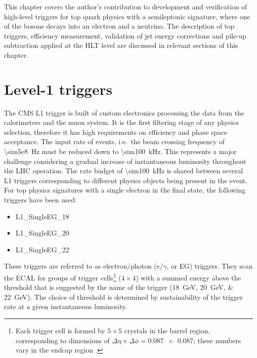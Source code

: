 This chapter covers the author's contribution to development and verification of high-level triggers for top quark
physics with a semileptonic signature, where one of the \W bosons decays into an electron and a neutrino. The description
of top triggers, efficiency measurement, validation of jet energy corrections and pile-up subtraction applied at the HLT
level are discussed in relevant sections of this chapter.

\section{Level-1 triggers}
The CMS L1 trigger \autocite{CMS_L1_Trigger_TDR} is built of custom electronics processing the data from the
calorimeters and the muon system. It is the first filtering stage of any physics selection, therefore it has high
requirements on efficiency and phase space acceptance. The input rate of events, i.e.\ the beam crossing frequency of
\SI{\sim5e8}{\hertz} must be reduced down to \SI{\sim100}{\kilo\hertz}. This represents a major challenge considering a
gradual increase of instantaneous luminosity throughout the LHC operation. The rate budget of \SI{\sim100}{\kilo\hertz}
is shared between several L1 triggers corresponding to different physics objects being present in the event. For top
physics signatures with a single electron in the final state, the following triggers have been used:

\begin{itemize}
 \item L1\_SingleEG\_18
 \item L1\_SingleEG\_20
 \item L1\_SingleEG\_22
\end{itemize}

These triggers are referred to as electron/photon (e/$\gamma$, or EG) triggers. They scan the ECAL for groups of trigger
cells\footnote{Each trigger cell is formed by $5 \times 5$ crystals in the barrel region, corresponding to dimensions of
$\Delta\eta \times \Delta\phi = \num{0.087 x 0.087}$; these numbers vary in the endcap region
\autocite{CMS_L1_Trigger_TDR}.} ($4 \times 4$) with a summed energy above the threshold that is suggested by the name of
the trigger (\SIlist{18;20;22}{\GeV}). The choice of threshold is determined by sustainability of the trigger rate at a
given instantaneous luminosity.


